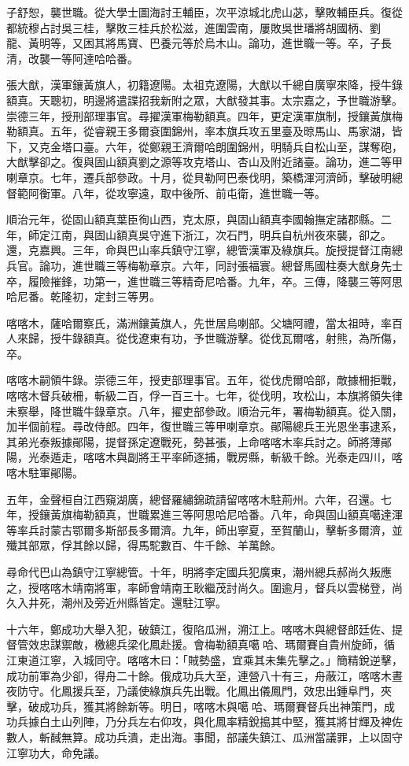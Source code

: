 \begin{pinyinscope}
子舒恕，襲世職。從大學士圖海討王輔臣，次平涼城北虎山苾，擊敗輔臣兵。復從都統穆占討吳三桂，擊敗三桂兵於松滋，進圍雲南，屢敗吳世璠將胡國柄、劉龍、黃明等，又困其將馬寶、巴養元等於烏木山。論功，進世職一等。卒，子長清，改襲一等阿達哈哈番。

張大猷，漢軍鑲黃旗人，初籍遼陽。太祖克遼陽，大猷以千總自廣寧來降，授牛錄額真。天聰初，明邊將遣諜招我新附之眾，大猷發其事。太宗嘉之，予世職游擊。崇德三年，授刑部理事官。尋擢漢軍梅勒額真。四年，更定漢軍旗制，授鑲黃旗梅勒額真。五年，從睿親王多爾袞圍錦州，率本旗兵攻五里臺及晾馬山、馬家湖，皆下，又克金塔口臺。六年，從鄭親王濟爾哈朗圍錦州，明騎兵自松山至，謀奪砲，大猷擊卻之。復與固山額真劉之源等攻克塔山、杏山及附近諸臺。論功，進二等甲喇章京。七年，遷兵部參政。十月，從貝勒阿巴泰伐明，築橋渾河濟師，擊破明總督範阿衡軍。八年，從攻寧遠，取中後所、前屯衛，進世職一等。

順治元年，從固山額真葉臣徇山西，克太原，與固山額真李國翰撫定諸郡縣。二年，師定江南，與固山額真吳守進下浙江，次石門，明兵自杭州夜來襲，卻之。還，克嘉興。三年，命與巴山率兵鎮守江寧，總管漢軍及綠旗兵。旋授提督江南總兵官。論功，進世職三等梅勒章京。六年，同討張福寰。總督馬國柱奏大猷身先士卒，履險摧鋒，功第一，進世職三等精奇尼哈番。九年，卒。三傳，降襲三等阿思哈尼番。乾隆初，定封三等男。

喀喀木，薩哈爾察氏，滿洲鑲黃旗人，先世居烏喇部。父塘阿禮，當太祖時，率百人來歸，授牛錄額真。從伐遼東有功，予世職游擊。從伐瓦爾喀，射熊，為所傷，卒。

喀喀木嗣領牛錄。崇德三年，授吏部理事官。五年，從伐虎爾哈部，敵據柵拒戰，喀喀木督兵破柵，斬級二百，俘一百三十。七年，從伐明，攻松山，本旗將領失律未察舉，降世職牛錄章京。八年，擢吏部參政。順治元年，署梅勒額真。從入關，加半個前程。尋改侍郎。四年，復世職三等甲喇章京。鄖陽總兵王光恩坐事逮系，其弟光泰叛據鄖陽，提督孫定遼戰死，勢甚張，上命喀喀木率兵討之。師將薄鄖陽，光泰遁走，喀喀木與副將王平率師逐捕，戰房縣，斬級千餘。光泰走四川，喀喀木駐軍鄖陽。

五年，金聲桓自江西窺湖廣，總督羅繡錦疏請留喀喀木駐荊州。六年，召還。七年，授鑲黃旗梅勒額真，世職累進三等阿思哈尼哈番。八年，命與固山額真噶達渾等率兵討蒙古鄂爾多斯部長多爾濟。九年，師出寧夏，至賀蘭山，擊斬多爾濟，並殲其部眾，俘其餘以歸，得馬駝數百、牛千餘、羊萬餘。

尋命代巴山為鎮守江寧總管。十年，明將李定國兵犯廣東，潮州總兵郝尚久叛應之，授喀喀木靖南將軍，率師會靖南王耿繼茂討尚久。圍逾月，督兵以雲梯登，尚久入井死，潮州及旁近州縣皆定。還駐江寧。

十六年，鄭成功大舉入犯，破鎮江，復陷瓜洲，溯江上。喀喀木與總督郎廷佐、提督管效忠謀禦敵，檄總兵梁化鳳赴援。會梅勒額真噶哈、瑪爾賽自貴州旋師，循江東道江寧，入城同守。喀喀木曰：「賊勢盛，宜乘其未集先擊之。」簡精銳逆擊，成功前軍為少卻，得舟二十餘。俄成功兵大至，連營八十有三，舟蔽江，喀喀木晝夜防守。化鳳援兵至，乃議使綠旗兵先出戰。化鳳出儀鳳門，效忠出鍾阜門，夾擊，破成功兵，獲其將餘新等。明日，喀喀木與噶哈、瑪爾賽督兵出神策門，成功兵據白土山列陣，乃分兵左右仰攻，與化鳳率精銳搗其中堅，獲其將甘輝及裨佐數人，斬馘無算。成功兵潰，走出海。事聞，部議失鎮江、瓜洲當議罪，上以固守江寧功大，命免議。


\end{pinyinscope}
